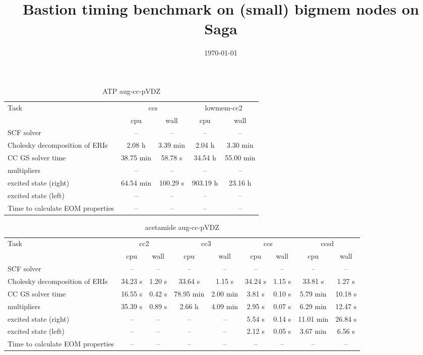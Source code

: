 \documentclass{article}
\title{Bastion timing benchmark on (small) bigmem nodes on Saga}
\date{\today}
\begin{document}
\maketitle
\begin{table}
\caption{ATP aug-cc-pVDZ}
\begin{tabular}{lcccc}
\toprule
Task & \multicolumn{2}{c}{ccs} & \multicolumn{2}{c}{lowmem-cc2}\\
\cmidrule(lr){2-3}\cmidrule(lr){4-5}
 & cpu & wall & cpu & wall\\
\midrule
SCF solver & -- & -- & -- & --\\
Cholesky decomposition of ERIs & 2.08 h & 3.39 min & 2.04 h & 3.30 min\\
CC GS solver time & 38.75 min & 58.78 s & 34.54 h & 55.00 min\\
multipliers & -- & -- & -- & --\\
excited state (right) & 64.54 min & 100.29 s & 903.19 h & 23.16 h\\
excited state (left) & -- & -- & -- & --\\
Time to calculate EOM properties & -- & -- & -- & --\\
\bottomrule
\end{tabular}
\end{table}
\begin{table}
\caption{acetamide aug-cc-pVDZ}
\begin{tabular}{lcccccccc}
\toprule
Task & \multicolumn{2}{c}{cc2} & \multicolumn{2}{c}{cc3} & \multicolumn{2}{c}{ccs} & \multicolumn{2}{c}{ccsd}\\
\cmidrule(lr){2-3}\cmidrule(lr){4-5}\cmidrule(lr){6-7}\cmidrule(lr){8-9}
 & cpu & wall & cpu & wall & cpu & wall & cpu & wall\\
\midrule
SCF solver & -- & -- & -- & -- & -- & -- & -- & --\\
Cholesky decomposition of ERIs & 34.23 s & 1.20 s & 33.64 s & 1.15 s & 34.24 s & 1.15 s & 33.81 s & 1.27 s\\
CC GS solver time & 16.55 s & 0.42 s & 78.95 min & 2.00 min & 3.81 s & 0.10 s & 5.79 min & 10.18 s\\
multipliers & 35.39 s & 0.89 s & 2.66 h & 4.09 min & 2.95 s & 0.07 s & 6.29 min & 12.47 s\\
excited state (right) & -- & -- & -- & -- & 5.54 s & 0.14 s & 11.01 min & 26.84 s\\
excited state (left) & -- & -- & -- & -- & 2.12 s & 0.05 s & 3.67 min & 6.56 s\\
Time to calculate EOM properties & -- & -- & -- & -- & -- & -- & -- & --\\
\bottomrule
\end{tabular}
\end{table}
\end{document}
